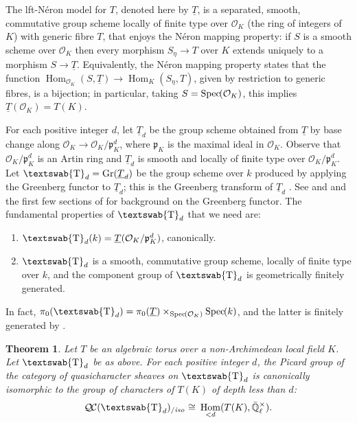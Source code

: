 \documentclass[11pt]{amsart}
\makeatletter
\newcommand{\mathswab}[1]{\operatorname{\textswab{#1}}}
\theoremstyle{plain}
\newtheorem{theorem}{Theorem}[section]
\theoremstyle{definition}
\theoremstyle{remark}
\newcommand{\Spec}[1]{{\operatorname{Spec}\hskip-1pt( #1 )}}
\newcommand{\EE}{\mathbb{\bar Q}_\ell}
\newcommand{\OK}{\mathcal{O}_K}
\newcommand{\pK}{\mathfrak{p}_K}
\newcommand{\Fq}{k}
\newcommand{\EEx}{\EE^\times}
\DeclareMathOperator{\Hom}{Hom}
\DeclareMathOperator{\Gr}{Gr}
\newcommand{\cdef}[1]{ {#1}\index{#1} }
\newcommand{\iso}{{\ \cong\ }}
\newcommand{\GN}[1]{\mathswab{#1}}
\newcommand{\TT}{\underline{T}}
\newcommand{\QC}{{\mathcal{Q\hskip-0.8pt C}}}
\newcommand{\QCiso}[1]{\QC(#1)_{/\textit{iso}}}
\newcommand{\labitem}[2]{%
\def\@itemlabel{\textbf{#1}}
\item
\def\@currentlabel{#1}\label{#2}}
\makeatother
\begin{document}

The lft-N\'eron model for $T$, denoted here by $\TT$, 
is a separated, smooth, commutative group scheme locally of finite type over $\OK$ 
(the ring of integers of $K$)
with generic fibre $T$, that enjoys the N\'eron mapping property: if
$S$ is a smooth scheme over $\OK$ then every morphism $S_\eta \to T$
over $K$ extends uniquely to a morphism $S \to \TT$. Equivalently, the
N\'eron mapping property states that the function
$\Hom_{\OK} (S,\TT) \to \Hom_K(S_\eta,T)$, given by restriction to
generic fibres, is a bijection; 
in particular, taking $S = \Spec{\OK}$, this implies $\TT(\OK) = T(K)$.

For each positive integer $d$, let $\TT_{d}$ be the group scheme obtained from $\TT$ by base change along $\OK \to \OK/\pK^d$, where $\pK$ is the maximal ideal in $\OK$. 
Observe that $\OK/\pK^d$ is an Artin ring and $\TT_{d}$ is smooth and locally of finite type over $\OK/\pK^d$.
%
Let \cdef{$\GN{T}_{d} = \Gr(\TT_d)$} be the group scheme over $\Fq$ produced by applying
the Greenberg functor to $\TT_{d}$; this is the \cdef{Greenberg transform of $\TT_d$}.
See \cite{Greenberg:2} and \cite[Ch. 9, \S 6]{BLR} and the first few sections of \cite{Stasinski} for background on the Greenberg functor. The fundamental properties of $\GN{T}_d$ that we need are:
 \begin{enumerate}
   \labitem{(GN.0)}{dFq} $\GN{T}_d(\Fq) = \TT(\OK/\pK^d)$, canonically.
  \labitem{(GN.1)}{GNd} $\GN{T}_d$ is a smooth, commutative group scheme, locally of finite type over $\Fq$, and the component group of $\GN{T}_d$ is geometrically finitely generated.
  \end{enumerate}
In fact, $\pi_0(\GN{T}_d) = \pi_0(\TT) \times_{\Spec{\OK}} \Spec{\Fq}$, and the latter is finitely generated by \cite{Xarles}. 

%
\begin{theorem}\label{thm:application}
  Let $T$ be an algebraic torus over a non-Archimedean local field $K$.
  Let $\GN{T}_d$ be as above.  For each positive integer $d$, the
  Picard group of the category of quasicharacter sheaves on $\GN{T}_d$ is
  canonically isomorphic to the group of characters of $T(K)$ of depth
  less than $d$:
  \[
  \QCiso{\GN{T}_d} \iso \Hom_{< d}(T(K),\EEx).
  \]
\end{theorem}
\end{document}
